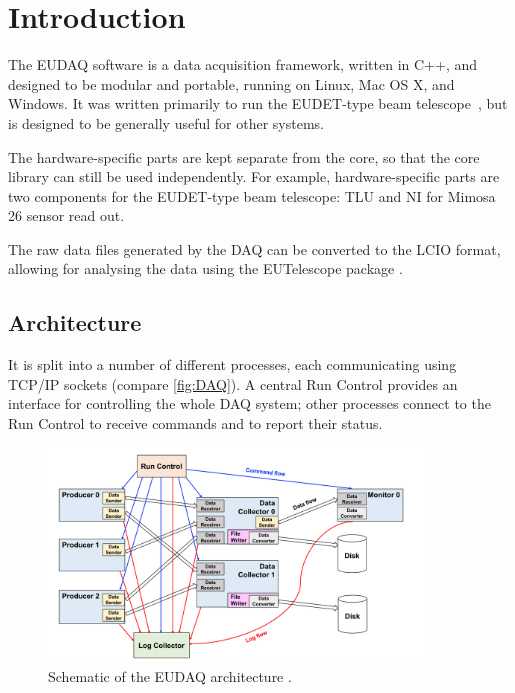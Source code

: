 \section{Introduction}
The EUDAQ software is a data acquisition framework, written in C++,
and designed to be modular and portable, running on Linux, Mac OS X, and Windows.
It was written primarily to run the EUDET-type beam telescope~\cite{Roloff:2009zza,Jansen:2016},
but is designed to be generally useful for other systems.

The hardware-specific parts are kept separate from the core,
so that the core library can still be used independently.
For example, hardware-specific parts are two components for the EUDET-type beam telescope: \gls{TLU} and \gls{NI} for Mimosa 26 sensor read out.

The raw data files generated by the DAQ can be converted to the \gls{LCIO} format,
allowing for analysing the data using the EUTelescope package \cite{eutel2008}.

\subsection{Architecture}
It is split into a number of different processes,
each communicating using TCP/IP sockets (compare \autoref{fig:DAQ}).
A central Run Control provides an interface for controlling the whole DAQ system;
other processes connect to the Run Control to receive commands and to report their status.

\begin{figure}[htb]
  \begin{center}
    \includegraphics[width=0.9\textwidth]{src/images/eudaq_working_principle}
    \caption{Schematic of the EUDAQ architecture \cite{Spannagel:2017}.}
    \label{fig:DAQ}
  \end{center}
\end{figure}


